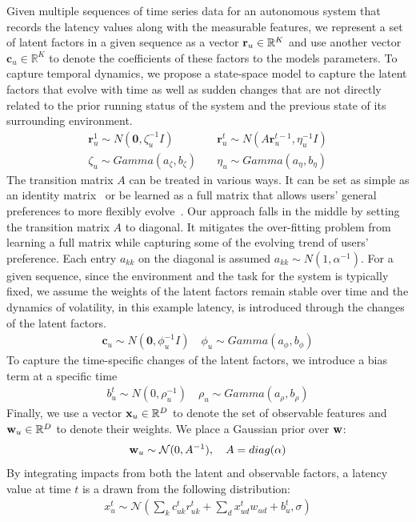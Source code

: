 \documentclass[12pt]{article}
\begin{document}
Given multiple sequences of time series data for an autonomous system that records the latency values along with the measurable features, we represent a set of latent factors in a given sequence as a vector ${\bf r}_u\in\mathbb{R}^K$ and use another vector  $\boldsymbol{c}_u\in\mathbb{R}^K$ to denote the coefficients of these factors to the models parameters. To capture temporal dynamics, we propose a state-space model to capture the latent factors that evolve with time as well as sudden changes that are not directly related to the prior running status of the system and the previous state of its surrounding environment. 
\begin{align}
\nonumber\boldsymbol{r}_u^1\sim N(\boldsymbol{0},\zeta_u^{-1}I)\quad
& \boldsymbol{r}_u^t\sim N(A\boldsymbol{r}_u^{t-1},\eta_u^{-1}I) \\
\nonumber\zeta_u\sim Gamma(a_{\zeta},b_{\zeta})\quad
& \eta_u\sim Gamma(a_{\eta},b_{\eta})
\end{align}
The transition matrix $A$ can be treated in various ways. It can be set as simple as an identity matrix~\cite{Charlin2015dpf} or be learned as a full matrix that allows users' general preferences to more flexibly evolve~\cite{Sun2014}. Our approach falls in the middle by setting the transition matrix $A$ to diagonal. It mitigates the over-fitting problem from learning a full matrix while capturing some of the evolving trend of users' preference. Each entry $a_{kk}$ on the diagonal is assumed $ a_{kk}\sim N(1,\alpha^{-1}) $. For a given sequence, since the environment and the task for the system is typically fixed, we assume the weights of the latent factors remain stable over time and the dynamics of volatility, in this example latency, is introduced through the changes of the latent factors. 
\begin{align}
\nonumber\boldsymbol{c}_u\sim N(\boldsymbol{0},\phi_u^{-1}I)\quad\phi_u\sim Gamma(a_{\phi},b_{\phi})
\end{align}
 To capture the time-specific changes of the latent factors, we introduce a bias term at a specific time
\begin{align}
\nonumber b_u^t\sim N(0,\rho_u^{-1})\quad\rho_u\sim Gamma(a_{\rho},b_{\rho})
\end{align}
Finally, we use a vector ${\bf x}_u \in \mathbb{R}^D$ to denote the set of observable features and ${\bf w}_u \in \mathbb{R}^D$ to denote their weights. We place a Gaussian prior over ${\bf w}$: 
 \begin{align}
 {\bf w}_u \sim \mathcal{N} (0,A^{-1}), \quad A=diag(\alpha)
 \end{align}
By integrating impacts from both the latent and observable factors, a latency value at time $t$ is a drawn from the following distribution: 
 \begin{align}
 x^t_u \sim \mathcal{N}(\sum_k c^t_{uk} r_{uk}^t+\sum_d x_{ud}^tw_{ud}+b_u^t,\sigma)
 \end{align}
 
\end{document}
